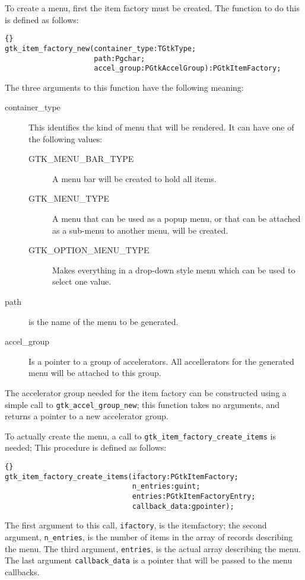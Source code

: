 \documentclass[10pt]{article}
\begin{document}
To create a menu, first the item factory must be created. The function to do 
this is defined as follows:
\begin{lstlisting}{}
gtk_item_factory_new(container_type:TGtkType; 
                     path:Pgchar;
                     accel_group:PGtkAccelGroup):PGtkItemFactory;
\end{lstlisting}
The three arguments to this function have the following meaning:
\begin{description}
\item[container\_type] This identifies the kind of menu that will be
rendered. It can have one of the following values:
\begin{description}
\item[GTK\_MENU\_BAR\_TYPE] A menu bar will be created to hold all items.
\item[GTK\_MENU\_TYPE] A menu that can be used as a popup menu, or that can be
attached as a sub-menu to another menu, will be created.
\item[GTK\_OPTION\_MENU\_TYPE] Makes everything in a drop-down style menu which
can be used to select one value.
\end{description}
\item[path] is the name of the menu to be generated.
\item[accel\_group] Is a pointer to a group of accelerators. All
accellerators for the generated menu will be attached to this group.
\end{description}

The accelerator group needed for the item factory can be constructed 
using a simple call to \lstinline|gtk_accel_group_new|; this function 
takes no arguments,  and returns a pointer to a new accelerator group.

To actually create the menu, a call to
\lstinline|gtk_item_factory_create_items| is needed; This procedure is 
defined as follows:
\begin{lstlisting}{}
gtk_item_factory_create_items(ifactory:PGtkItemFactory; 
                              n_entries:guint; 
                              entries:PGtkItemFactoryEntry; 
                              callback_data:gpointer);
\end{lstlisting}
The first argument to this call, \lstinline|ifactory|, is the itemfactory; 
the second argument, \lstinline|n_entries|, is the number of items in the 
array of records describing the menu. The third argument, \lstinline|entries|,
is the actual array describing the menu. The last argument
\lstinline|callback_data| is a pointer that will be passed to the menu
callbacks.
\end{document}
